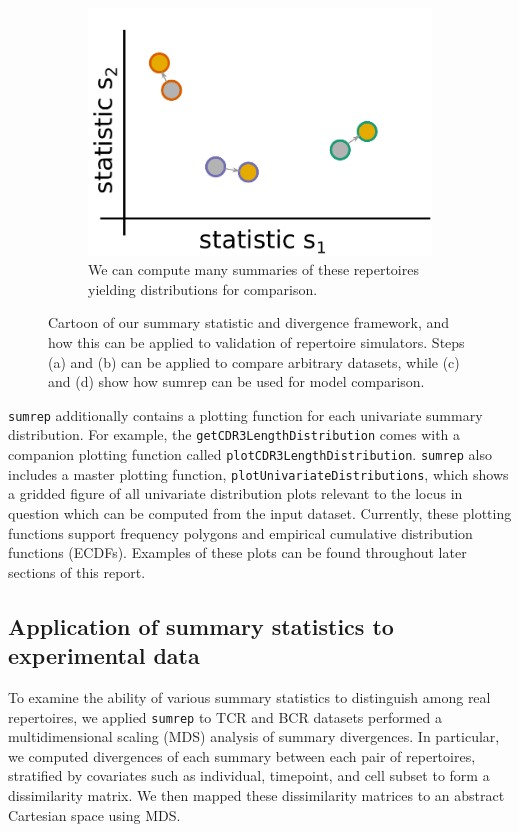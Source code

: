 \documentclass{article}
\begin{document}
\begin{figure}
\begin{subfigure}[t]{0.49\linewidth}
\begin{center}
     	\includegraphics[width=0.6\linewidth]{Figures/paired_summaries.pdf}
		\end{center}
		\caption{We can compute many summaries of these repertoires yielding distributions for comparison.}
		\label{fig:DataSimSummary}
    \end{subfigure}
    \caption{Cartoon of our summary statistic and divergence framework, and how this can be applied to validation of repertoire simulators. Steps (a) and (b) can be applied to compare arbitrary datasets, while (c) and (d) show how sumrep can be used for model comparison.}
    \label{fig:SummaryFramework}
\end{figure}

\texttt{sumrep} additionally contains a plotting function for each univariate summary distribution.
For example, the \texttt{getCDR3LengthDistribution} comes with a companion plotting function called \texttt{plotCDR3LengthDistribution}.
\texttt{sumrep} also includes a master plotting function, \texttt{plotUnivariateDistributions}, which shows a gridded figure of all univariate distribution plots relevant to the locus in question which can be computed from the input dataset.
Currently, these plotting functions support frequency polygons and empirical cumulative distribution functions (ECDFs).
Examples of these plots can be found throughout later sections of this report.

\subsection*{Application of summary statistics to experimental data}
To examine the ability of various summary statistics to distinguish among real repertoires, we applied \texttt{sumrep} to TCR and BCR datasets performed a multidimensional scaling (MDS) analysis of summary divergences.
In particular, we computed divergences of each summary between each pair of repertoires, stratified by covariates such as individual, timepoint, and cell subset to form a dissimilarity matrix.
We then mapped these dissimilarity matrices to an abstract Cartesian space using MDS.
\end{document}
